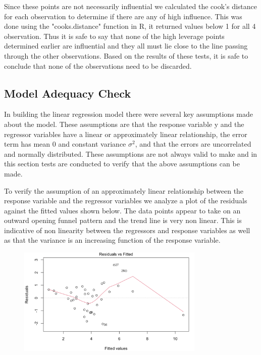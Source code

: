 \documentclass[12pt]{report}
\begin{document}
Since these points are not necessarily influential we calculated the cook's distance for each observation to determine if there are any of high influence. This was done using the "cooks.distance" function in R, it returned values below 1 for all 4 observation. Thus it is safe to say that none of the high leverage points determined earlier are influential and they all must lie close to the line passing through the other observations. Based on the results of these tests, it is safe to conclude that none of the observations need to be discarded.

\subsection{Model Adequacy Check}

In building the linear regression model there were several key assumptions made about the model. These assumptions are that the response variable y and the regressor variables have a linear or approximately linear relationship, the error term has mean 0 and constant variance $\sigma^{2}$, and that the errors are uncorrelated and normally distributed. These assumptions are not always valid to make and in this section tests are conducted to verify that the above assumptions can be made. 

To verify the assumption of an approximately linear relationship between the response variable and the regressor variables we analyze a plot of the residuals against the fitted values shown below. The data points appear to take on an outward opening funnel pattern and the trend line is very non linear. This is indicative of non linearity between the regressors and response variables as well as that the variance is an increasing function of the response variable.   

\begin{figure}[H]
    \centering
    \includegraphics[width=0.8\textwidth]{Adequacy tests/Residual plot.png}
\end{figure}
\noindent
\end{document}
